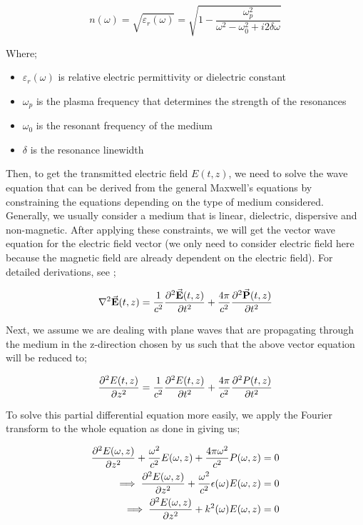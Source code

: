 \begin{equation}
    n(\omega) = \sqrt{\varepsilon_{r}(\omega)} = \sqrt{1 - \frac{\omega_{p}^{2}}{\omega^{2} - \omega_{0}^{2} + i2\delta\omega}}
    \label{eqn: nw}
\end{equation}

Where;

\begin{itemize}
    \item $\varepsilon_{r}(\omega)$ is relative electric permittivity or dielectric constant
    \item $\omega_{p}$ is the plasma frequency that determines the strength of the resonances
    \item $\omega_{0}$ is the resonant frequency of the medium
    \item $\delta$ is the resonance linewidth
\end{itemize}

Then, to get the transmitted electric field $E(t, z)$, we need to solve the wave equation that can be derived from the general Maxwell's equations by constraining the equations depending on the type of medium considered. Generally, we usually consider a medium that is linear, dielectric, dispersive and non-magnetic. After applying these constraints, we will get the vector wave equation for the electric field vector (we only need to consider electric field here because the magnetic field are already dependent on the electric field). For detailed derivations, see \cite{jackson1999classical};

\begin{equation}
    \laplacian{\va{E}(t, z)} = \frac{1}{c^2} \pdv[2]{\va{E}(t, z)}{t} + \frac{4\pi}{c^2} \pdv[2]{\va{P}(t, z)}{t}
\end{equation}

Next, we assume we are dealing with plane waves that are propagating through the medium in the z-direction chosen by us such that the above vector equation will be reduced to;

\begin{equation}
    \pdv[2]{E(t, z)}{z} = \frac{1}{c^2} \pdv[2]{E(t, z)}{t} + \frac{4\pi}{c^2} \pdv[2]{P(t, z)}{t}
    \label{eqn: scalarMaxwellWaveEquation}
\end{equation}

To solve this partial differential equation more easily, we apply the Fourier transform to the whole equation as done in \cite{Jeong2006} giving us;

\begin{align}
	\pdv[2]{E(\omega, z)}{z} + \frac{\omega^{2}}{c^{2}} E(\omega, z) + \frac{4\pi\omega^{2}}{c^{2}} P(\omega, z) &= 0\\
	\implies \pdv[2]{E(\omega, z)}{z} + \frac{\omega^{2}}{c^{2}} \epsilon(\omega) E(\omega, z) &= 0\\
	\implies \pdv[2]{E(\omega, z)}{z} + k^{2} (\omega) E(\omega, z) &= 0 \label{eqn: wave eqn freq}
\end{align}

